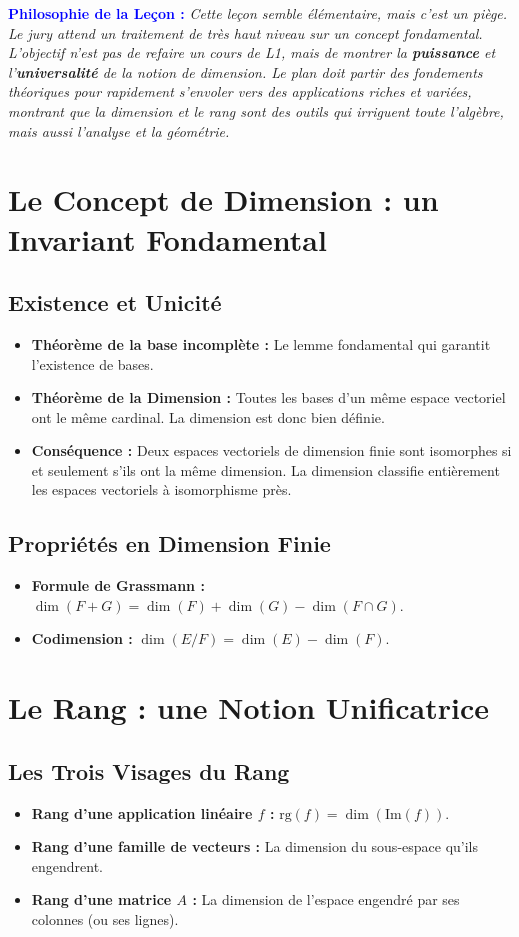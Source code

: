 \documentclass[12pt, a4paper, parskip=full]{report}
\theoremstyle{agregstyle}
\newenvironment{philosophie}
  {\par\medskip\noindent\begin{oframed}\noindent\textbf{\textcolor{blue}{Philosophie de la Leçon :}}\itshape}
  {\end{oframed}\par\medskip}
\begin{document}
\begin{philosophie}
    Cette leçon semble élémentaire, mais c'est un piège. Le jury attend un traitement de très haut niveau sur un concept fondamental. L'objectif n'est pas de refaire un cours de L1, mais de montrer la \textbf{puissance} et l'\textbf{universalité} de la notion de dimension. Le plan doit partir des fondements théoriques pour rapidement s'envoler vers des applications riches et variées, montrant que la dimension et le rang sont des outils qui irriguent toute l'algèbre, mais aussi l'analyse et la géométrie.
\end{philosophie}

\section{Le Concept de Dimension : un Invariant Fondamental}
\subsection{Existence et Unicité}
\begin{itemize}
    \item \textbf{Théorème de la base incomplète :} Le lemme fondamental qui garantit l'existence de bases.
    \item \textbf{Théorème de la Dimension :} Toutes les bases d'un même espace vectoriel ont le même cardinal. La dimension est donc bien définie.
    \item \textbf{Conséquence :} Deux espaces vectoriels de dimension finie sont isomorphes si et seulement s'ils ont la même dimension. La dimension classifie entièrement les espaces vectoriels à isomorphisme près.
\end{itemize}
\subsection{Propriétés en Dimension Finie}
\begin{itemize}
    \item \textbf{Formule de Grassmann :} $\dim(F+G) = \dim(F) + \dim(G) - \dim(F \cap G)$.
    \item \textbf{Codimension :} $\dim(E/F) = \dim(E) - \dim(F)$.
\end{itemize}

\section{Le Rang : une Notion Unificatrice}
\subsection{Les Trois Visages du Rang}
\begin{itemize}
    \item \textbf{Rang d'une application linéaire $f$ :} $\mathrm{rg}(f) = \dim(\mathrm{Im}(f))$.
    \item \textbf{Rang d'une famille de vecteurs :} La dimension du sous-espace qu'ils engendrent.
    \item \textbf{Rang d'une matrice $A$ :} La dimension de l'espace engendré par ses colonnes (ou ses lignes).
\end{itemize}
\end{document}
